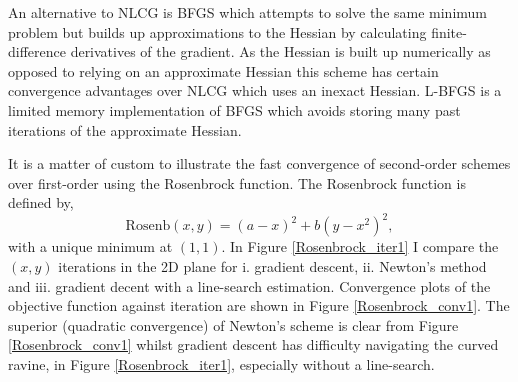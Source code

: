 \documentclass[11pt,twocolumn]{article}
\begin{document}
An alternative to NLCG is BFGS which attempts to solve the same minimum problem but builds up approximations to the Hessian by calculating finite-difference derivatives of the gradient. As the Hessian is built up numerically as opposed to relying on an approximate Hessian this scheme has certain convergence advantages over NLCG which uses an inexact Hessian. L-BFGS is a limited memory implementation of BFGS which avoids storing many past iterations of the approximate Hessian.

It is a matter of custom to illustrate the fast convergence of second-order schemes over first-order using the Rosenbrock function. The Rosenbrock function is defined by,
\begin{equation}
\textrm{Rosenb}(x,y)=(a-x)^2+b(y-x^2)^2,\label{rosen_defn}
\end{equation}
with a unique minimum at $(1,1)$. In Figure \ref{Rosenbrock_iter1} I compare the $(x,y)$ iterations in the 2D plane for  i. gradient descent, ii. Newton's method and iii. gradient decent with a line-search estimation.  Convergence plots of the objective function against iteration are shown in Figure \ref{Rosenbrock_conv1}. The superior (quadratic convergence) of Newton's scheme is clear from Figure \ref{Rosenbrock_conv1} whilst gradient descent has difficulty navigating the curved ravine, in Figure \ref{Rosenbrock_iter1}, especially without a line-search. 
\end{document}
